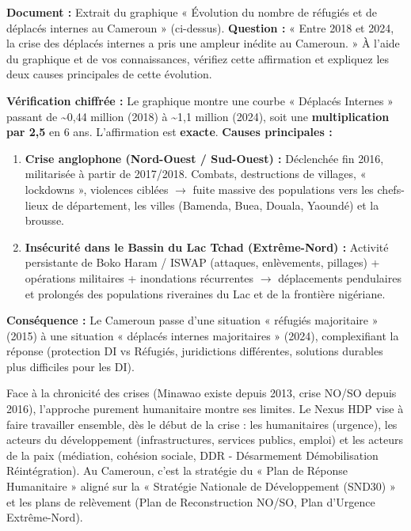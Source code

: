 \documentclass[11pt]{article}
\newcommand{\cle}[1]{{\popxbold\color{popdark}#1}}
\begin{document}
\begin{exercice}
\textbf{Document :} Extrait du graphique « Évolution du nombre de réfugiés et de déplacés internes au Cameroun » (ci-dessus).
\textbf{Question :} « Entre 2018 et 2024, la crise des déplacés internes a pris une ampleur inédite au Cameroun. » À l'aide du graphique et de vos connaissances, vérifiez cette affirmation et expliquez les deux causes principales de cette évolution.
\end{exercice}

\begin{corrige}[Exercice 2]
\textbf{Vérification chiffrée :} Le graphique montre une courbe « Déplacés Internes » passant de \textasciitilde 0,44 million (2018) à \textasciitilde 1,1 million (2024), soit une \textbf{multiplication par 2,5} en 6 ans. L'affirmation est \textbf{exacte}.
\textbf{Causes principales :}
\begin{enumerate}
    \item \textbf{Crise anglophone (Nord-Ouest / Sud-Ouest) :} Déclenchée fin 2016, militarisée à partir de 2017/2018. Combats, destructions de villages, « lockdowns », violences ciblées $\rightarrow$ fuite massive des populations vers les chefs-lieux de département, les villes (Bamenda, Buea, Douala, Yaoundé) et la brousse.
    \item \textbf{Insécurité dans le Bassin du Lac Tchad (Extrême-Nord) :} Activité persistante de Boko Haram / ISWAP (attaques, enlèvements, pillages) + opérations militaires + inondations récurrentes $\rightarrow$ déplacements pendulaires et prolongés des populations riveraines du Lac et de la frontière nigériane.
\end{enumerate}
\textbf{Conséquence :} Le Cameroun passe d'une situation « réfugiés majoritaire » (2015) à une situation « déplacés internes majoritaires » (2024), complexifiant la réponse (protection DI vs Réfugiés, juridictions différentes, solutions durables plus difficiles pour les DI).
\end{corrige}

\begin{savaistu}
Face à la chronicité des crises (Minawao existe depuis 2013, crise NO/SO depuis 2016), l'approche purement humanitaire montre ses limites. Le \cle{Nexus HDP} vise à faire travailler ensemble, dès le début de la crise : les humanitaires (urgence), les acteurs du développement (infrastructures, services publics, emploi) et les acteurs de la paix (médiation, cohésion sociale, DDR - Désarmement Démobilisation Réintégration). Au Cameroun, c'est la stratégie du « Plan de Réponse Humanitaire » aligné sur la « Stratégie Nationale de Développement (SND30) » et les plans de relèvement (Plan de Reconstruction NO/SO, Plan d'Urgence Extrême-Nord).
\end{savaistu}
\end{document}
